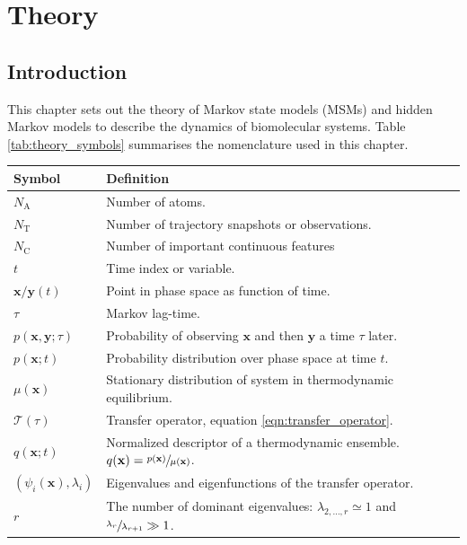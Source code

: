 %
\let\textcircled=\pgftextcircled
\chapter{Theory}
\label{chap:theory}

\section{Introduction}
This chapter sets out the theory of Markov state models (MSMs) and hidden Markov models to describe the dynamics of biomolecular systems. Table \ref{tab:theory_symbols} summarises the  nomenclature used in this chapter. 

\begin{table}
    \centering
    \begin{tabularx}{0.9\textwidth}{ |l| >{\raggedright\arraybackslash}X | } 
        \hline
        \textbf{Symbol}  &  \textbf{Definition} \\
        \hline\hline
        $N_{\mathrm{A}}$ & Number of atoms. \\
        $N_{\mathrm{T}}$ & Number of trajectory snapshots or observations. \\
        $N_{\mathrm{C}}$ & Number of important continuous features  \\
        $t$ & Time index or variable. \\
        $\mathbf{x}/\mathbf{y}(t)$ & Point in phase space as function of time. \\
        $\tau$ & Markov lag-time. \\
        $p(\mathbf{x}, \mathbf{y}; \tau)$ & Probability of observing $\mathbf{x}$ and then $\mathbf{y}$ a time $\tau$ later. \\
        $p(\mathbf{x}; t)$ & Probability distribution over phase space at time $t$. \\
        $\mu(\mathbf{x})$ & Stationary distribution of system in thermodynamic equilibrium.  \\ 
        $\mathcal{T}(\tau)$ & Transfer operator, equation \ref{eqn:transfer_operator}.  \\
        $q(\mathbf{x}; t)$ & Normalized descriptor of a thermodynamic ensemble. $q(\mathbf{x}) = \sfrac{p(\mathbf{x})}{\mu(\mathbf{x})}$. \\
        $(\psi_{i}(\mathbf{x}), \lambda_{i})$ & Eigenvalues and eigenfunctions of the transfer operator.  \\
        $r$ & The number of dominant eigenvalues: $\lambda_{2,\ldots, r}\simeq 1$ and $\sfrac{\lambda_{r}}{\lambda_{r+1}} \gg 1$. \\

\end{tabularx}
\end{table}

